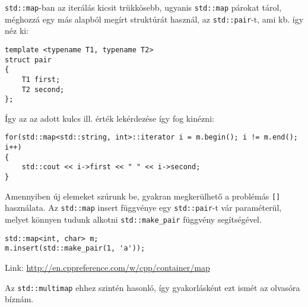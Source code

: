 \documentclass[a4paper,11.5pt,table]{article}
\begin{document}
	
	\texttt{std::map}-ban az iterálás kicsit trükkösebb, ugyanis \texttt{std::map} párokat tárol, méghozzá egy más alapból megírt struktúrát használ, az \texttt{std::pair}-t, ami kb. így néz ki:
	\begin{lstlisting}
template <typename T1, typename T2>
struct pair
{
	T1 first;
	T2 second;
};
	\end{lstlisting}
	Így az az adott kulcs ill. érték lekérdezése így fog kinézni:
	\begin{lstlisting}
for(std::map<std::string, int>::iterator i = m.begin(); i != m.end(); i++)
{
	std::cout << i->first << " " << i->second;
}
	\end{lstlisting}
	Amennyiben új elemeket szúrunk be, gyakran megkerülhető a problémás \texttt{[]} használata. Az \texttt{std::map} insert függvénye egy \texttt{std::pair}-t vár paraméterül, melyet könnyen tudunk alkotni \texttt{std::make\_pair} függvény segítségével.
	\begin{lstlisting}
std::map<int, char> m;
m.insert(std::make_pair(1, 'a'));
	\end{lstlisting}
	
	Link: \url{http://en.cppreference.com/w/cpp/container/map}
	\begin{note}
		Az \texttt{std::multimap} ehhez szintén hasonló, így gyakorlásként ezt ismét az olvasóra bíznám.
	\end{note}
\end{document}

